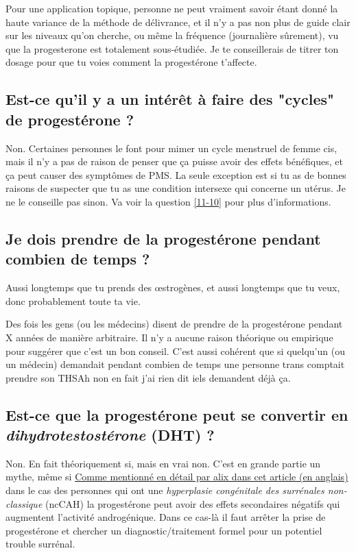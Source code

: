 \documentclass{article}
\begin{document}
Pour une application topique, personne ne peut vraiment savoir étant donné la haute variance de la méthode de délivrance, et il n'y a pas non plus de guide clair sur les niveaux qu'on cherche, ou même la fréquence (journalière sûrement), vu que la progesterone est totalement sous-étudiée. Je te conseillerais de titrer ton dosage pour que tu voies comment la progestérone t'affecte.

\subsection{Est-ce qu'il y a un intérêt à faire des "cycles" de progestérone ?}\label{8-11}

Non. Certaines personnes le font pour mimer un cycle menstruel de femme cis, mais il n'y a pas de raison de penser que ça puisse avoir des effets bénéfiques, et ça peut causer des symptômes de PMS. La seule exception est si tu as de bonnes raisons de suspecter que tu as une condition intersexe qui concerne un utérus. Je ne le conseille pas sinon. Va voir la question \ref{11-10} pour plus d'informations. 

\subsection{Je dois prendre de la progestérone pendant combien de temps ?}

Aussi longtemps que tu prends des œstrogènes, et aussi longtemps que tu veux, donc probablement toute ta vie.

Des fois les gens (ou les médecins) disent de prendre de la progestérone pendant X années de manière arbitraire. Il n'y a aucune raison théorique ou empirique pour suggérer que c'est un bon conseil. C'est aussi cohérent que si quelqu'un (ou un médecin) demandait pendant combien de temps une personne trans comptait prendre son THS\textemdash{}Ah non en fait j'ai rien dit iels demandent déjà ça. 

\subsection{Est-ce que la progestérone peut se convertir en \textit{dihydrotestostérone} (DHT) ?}

Non. En fait théoriquement si, mais en vrai non. C'est en grande partie un mythe, même si \href{https://whsah.co/posts/rethinking-progesterone-and-androgens/}{Comme mentionné en détail par alix dans cet article (en anglais)} dans le cas des personnes qui ont une \textit{hyperplasie congénitale des surrénales non-classique} (ncCAH) la progestérone peut avoir des effets secondaires négatifs qui augmentent l'activité androgénique. Dans ce cas-là il faut arrêter la prise de progestérone et chercher un diagnostic/traitement formel pour un potentiel trouble surrénal.
\end{document}

